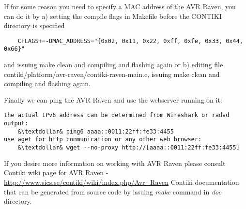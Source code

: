 \documentclass{article}
\begin{document}
If for some reason you need to specify a MAC address of the AVR Raven, you can do it by
a) setting the compile flags in Makefile before the CONTIKI directory is specified
\begin{lstlisting}
	CFLAGS+=-DMAC_ADDRESS="{0x02, 0x11, 0x22, 0xff, 0xfe, 0x33, 0x44, 0x66}"
\end{lstlisting}
and issuing make clean and compiling and flashing again
or
b) editing file contiki/platform/avr-raven/contiki-raven-main.c,
issuing make clean and compiling and flashing again.

Finally we can ping the AVR Raven and use the webserver running on it:
\begin{lstlisting}
the actual IPv6 address can be determined from Wireshark or radvd output:
	&\textdollar& ping6 aaaa::0011:22ff:fe33:4455
use wget for http communication or any other web browser:
	&\textdollar& wget --no-proxy http://[aaaa::0011:22ff:fe33:4455]
\end{lstlisting}


If you desire more information on working with AVR Raven please consult
Contiki wiki page for AVR Raven - \url{http://www.sics.se/contiki/wiki/index.php/Avr_Raven}
Contiki documentation that can be generated from source code
by issuing {\it{make}} command in {\it{doc}} directory.
\end{document}

